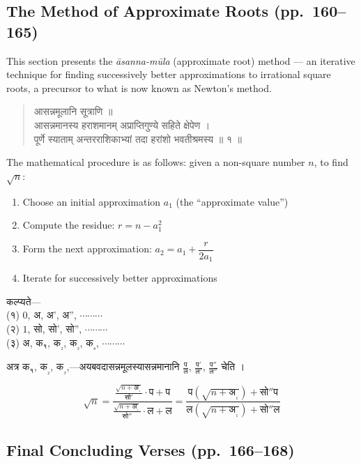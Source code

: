 \documentclass[11pt,a4paper]{article}
\newcommand{\dev}[1]{{\devanagarifont #1}}
\newenvironment{sanskritverse}{%
  \begin{quote}
}{%
  \end{quote}
}
\begin{document}
\subsection{The Method of Approximate Roots (pp.\ 160--165)}

This section presents the \textit{āsanna-mūla} (approximate root) method --- an iterative technique for finding successively better approximations to irrational square roots, a precursor to what is now known as Newton's method.

\begin{sanskritverse}
\dev{%
आसन्नमूलानि सूत्राणि ॥\\[0.5em]
आसन्नमानस्य हराशमानम् अप्राप्तिगुण्ये सहिते क्षेपेण ।\\
पूर्णे स्याताम् अन्तरराशिकाभ्यां तदा हरांशो भवतीश्रमस्य ॥ १ ॥}
\end{sanskritverse}

The mathematical procedure is as follows: given a non-square number $n$, to find $\sqrt{n}$:
\begin{enumerate}[label=\arabic*.]
  \item Choose an initial approximation $a_1$ (the ``approximate value'')
  \item Compute the residue: $r = n - a_1^2$
  \item Form the next approximation: $a_2 = a_1 + \dfrac{r}{2a_1}$
  \item Iterate for successively better approximations
\end{enumerate}

\dev{%
कल्प्यते—\\
(१) $0$, अ, अ', अ'', $\cdots\cdots\cdots$\\
(२) $1$, सो, सो', सो'', $\cdots\cdots\cdots$\\
(३) अ, क$_१$, क$_₂$, क$_₃$, क$_₄$, $\cdots\cdots\cdots$}

\dev{%
अत्र क$_१$, क$_₂$, क$_₃$,—अयबवदासन्नमूलस्यासन्नमानानि $\frac{\text{प}}{\text{ल}}$, $\frac{\text{प}'}{\text{ल}'}$, $\frac{\text{प}''}{\text{ल}''}$ चेति ।}

$$\sqrt{n} = \frac{\frac{\sqrt{n+\text{अ}_₁}}{\text{सो}'} \cdot \text{प} + \text{प}}{\frac{\sqrt{n+\text{अ}_₁}}{\text{सो}''} \cdot \text{ल} + \text{ल}} = \frac{\text{प}(\sqrt{n+\text{अ}_₁}) + \text{सो}''\text{प}}{\text{ल}(\sqrt{n+\text{अ}_₁}) + \text{सो}''\text{ल}}$$

\subsection{Final Concluding Verses (pp.\ 166--168)}
\end{document}
